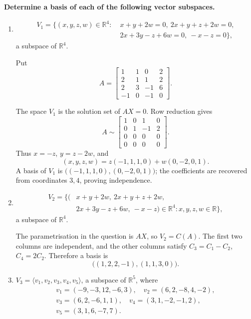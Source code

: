 \providecommand{\rank}{\operatorname{r}}
\providecommand{\RR}{\mathbb R}
\providecommand{\CC}{\mathbb C}
\providecommand{\KK}{\mathbb K}

\setcounter{enumi}{83}
\item {\bfseries\boldmath
Determine a basis of each of the following vector subspaces.
}

\begin{enumerate}[label=\alph*)]

\item
\[
\begin{split}V_1=\{(x,y,z,w)\in\RR^4:\;&x+y+2w=0,\ 2x+y+z+2w=0,\\&2x+3y-z+6w=0,\ -x-z=0\},\end{split}
\]
a subspace of $\RR^4$.

\begin{answer}
Put
\[
 A=\begin{bmatrix}1&1&0&2\\2&1&1&2\\2&3&-1&6\\-1&0&-1&0\end{bmatrix}.
\]

The space $V_1$ is the solution set of $AX=0$. Row reduction gives
\[
 A\sim\begin{bmatrix}1&0&1&0\\0&1&-1&2\\0&0&0&0\\0&0&0&0\end{bmatrix}.
\]
Thus $x=-z$, $y=z-2w$, and
\[
 (x,y,z,w)=z(-1,1,1,0)+w(0,-2,0,1).
\]
A basis of $V_1$ is $\bigl((-1,1,1,0),(0,-2,0,1)\bigr)$; the coefficients
are recovered from coordinates $3,4$, proving independence.
\end{answer}

\item
\[
\begin{split}V_2=\{(&x+y+2w,\ 2x+y+z+2w,\\&2x+3y-z+6w,\ -x-z)\in\RR^4:x,y,z,w\in\RR\},\end{split}
\]
a subspace of $\RR^4$.

\begin{answer}
The parametrisation in the question is $AX$, so $V_2=C(A)$.
The first two columns are independent, and the other columns satisfy
$C_3=C_1-C_2$, $C_4=2C_2$.
Therefore a basis is
\[
 \bigl((1,2,2,-1),(1,1,3,0)\bigr).
\]
\end{answer}

\item $V_3=\langle v_1,v_2,v_3,v_4,v_5\rangle$, a subspace of $\RR^5$, where
\[
\begin{gathered}v_1=(-9,-3,12,-6,3),\quad v_2=(6,2,-8,4,-2),\\v_3=(6,2,-6,1,1),\quad v_4=(3,1,-2,-1,2),\\v_5=(3,1,6,-7,7).\end{gathered}
\]


\end{enumerate}
